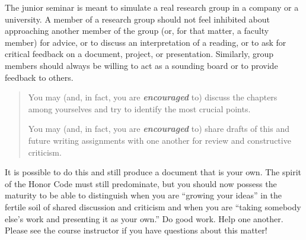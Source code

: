 The junior seminar is meant to simulate a real research group in a company or a university.  A member of a research
group should not feel inhibited about approaching another member of the group (or, for that matter, a faculty member)
for advice, or to discuss an interpretation of a reading, or to ask for critical feedback on a document, project, or
presentation.  Similarly, group members should always be willing to act as a sounding board or to provide feedback to
others.

\begin{quote}
\color{black}
You may (and, in fact, you are \textit{\textbf{encouraged}} to) discuss the chapters among
yourselves and try to identify the most crucial points.

You may (and, in fact, you are  \textit{\textbf{encouraged}} to) share
drafts of this and future writing assignments with one another for review
and constructive criticism. 
\end{quote}

It is possible to do this and still produce a document that is your own. The spirit of the Honor Code must still
predominate, but you should now possess the maturity to be able to distinguish when you are ``growing your ideas'' in
the fertile soil of shared discussion and criticism and when you are ``taking somebody else's work and presenting it as
your own.'' Do good work. Help one another. Please see the course instructor if you have questions about this matter!


